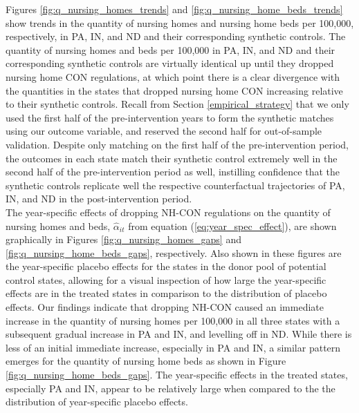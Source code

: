 \documentclass[../Main.tex]{subfiles}
\begin{document}
\indent Figures \ref{fig:q_nursing_homes_trends} and \ref{fig:q_nursing_home_beds_trends} show trends in the quantity of nursing homes and nursing home beds per 100,000, respectively, in PA, IN, and ND and their corresponding synthetic controls. The quantity of nursing homes and beds per 100,000 in PA, IN, and ND and their corresponding synthetic controls are virtually identical up until they dropped nursing home CON regulations, at which point there is a clear divergence with the quantities in the states that dropped nursing home CON increasing relative to their synthetic controls. Recall from Section \ref{empirical_strategy} that we only used the first half of the pre-intervention years to form the synthetic matches using our outcome variable, and reserved the second half for out-of-sample validation. Despite only matching on the first half of the pre-intervention period, the outcomes in each state match their synthetic control extremely well in the second half of the pre-intervention period as well, instilling confidence that the synthetic controls replicate well the respective counterfactual trajectories of PA, IN, and ND in the post-intervention period.\\
\indent The year-specific effects of dropping NH-CON regulations on the quantity of nursing homes and beds, $\hat{\alpha}_{it}$ from equation (\ref{eq:year_spec_effect}), are shown graphically in Figures \ref{fig:q_nursing_homes_gaps} and \ref{fig:q_nursing_home_beds_gaps}, respectively. Also shown in these figures are the year-specific placebo effects for the states in the donor pool of potential control states, allowing for a visual inspection of how large the year-specific effects are in the treated states in comparison to the distribution of placebo effects. Our findings indicate that dropping NH-CON caused an immediate increase in the quantity of nursing homes per 100,000 in all three states with a subsequent gradual increase in PA and IN, and levelling off in ND. While there is less of an initial immediate increase, especially in PA and IN, a similar pattern emerges for the quantity of nursing home beds as shown in Figure \ref{fig:q_nursing_home_beds_gaps}. The year-specific effects in the treated states, especially PA and IN, appear to be relatively large when compared to the the distribution of year-specific placebo effects.\\
\end{document}
